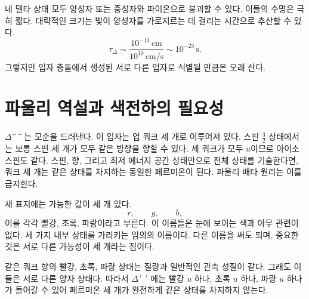 네 델타 상태 모두 양성자 또는 중성자와 파이온으로 붕괴할 수 있다. 이들의 수명은 극히 짧다. 대략적인 크기는 빛이 양성자를 가로지르는 데 걸리는 시간으로 추산할 수 있다.
\begin{equation}
\tau_\Delta
\sim
\frac{10^{-13}\,\mathrm{cm}}
     {10^{10}\,\mathrm{cm/s}}
\sim10^{-23}\,\mathrm{s}.
\end{equation}
그렇지만 입자 충돌에서 생성된 서로 다른 입자로 식별될 만큼은 오래 산다.

\begin{classroomqa}
\end{classroomqa}

\section{파울리 역설과 색전하의 필요성}

\(\Delta^{++}\)는 모순을 드러낸다. 이 입자는 업 쿼크 세 개로 이루어져 있다. 스핀 \(\tfrac32\) 상태에서는 보통 스핀 세 개가 모두 같은 방향을 향할 수 있다. 세 쿼크가 모두 \(u\)이므로 아이소스핀도 같다. 스핀, 향, 그리고 최저 에너지 공간 상태만으로 전체 상태를 기술한다면, 쿼크 세 개는 같은 상태를 차지하는 동일한 페르미온이 된다. 파울리 배타 원리는 이를 금지한다.

\begin{classroomqa}
\end{classroomqa}

새 표지에는 가능한 값이 세 개 있다.
\begin{equation}
r,\qquad g,\qquad b,
\end{equation}
이를 각각 빨강, 초록, 파랑이라고 부른다. 이 이름들은 눈에 보이는 색과 아무 관련이 없다. 세 가지 내부 상태를 가리키는 임의의 이름이다. 다른 이름을 써도 되며, 중요한 것은 서로 다른 가능성이 세 개라는 점이다.

같은 쿼크 향의 빨강, 초록, 파랑 상태는 질량과 일반적인 관측 성질이 같다. 그래도 이들은 서로 다른 양자 상태다. 따라서 \(\Delta^{++}\)에는 빨강 \(u\) 하나, 초록 \(u\) 하나, 파랑 \(u\) 하나가 들어갈 수 있어 페르미온 세 개가 완전하게 같은 상태를 차지하지 않는다.

